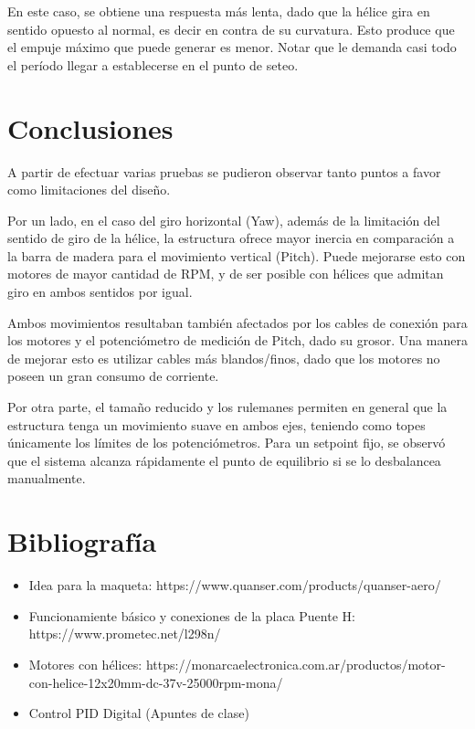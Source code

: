 \documentclass{article}
\begin{document}
En este caso, se obtiene una respuesta más lenta, dado que la hélice gira en sentido opuesto al normal, es decir en contra de su curvatura. Esto produce que el empuje máximo que puede generar es menor. Notar que le demanda casi todo el período llegar a establecerse en el punto de seteo.

\newpage

\section{Conclusiones}

A partir de efectuar varias pruebas se pudieron observar tanto puntos a favor como limitaciones del diseño.\par
Por un lado, en el caso del giro horizontal (Yaw), además de la limitación del sentido de giro de la hélice, la estructura ofrece mayor inercia en comparación a la barra de madera para el movimiento vertical (Pitch). Puede mejorarse esto con motores de mayor cantidad de RPM, y de ser posible con hélices que admitan giro en ambos sentidos por igual.\par
Ambos movimientos resultaban también afectados por los cables de conexión para los motores y el potenciómetro de medición de Pitch, dado su grosor. Una manera de mejorar esto es utilizar cables más blandos/finos, dado que los motores no poseen un gran consumo de corriente.\par
Por otra parte, el tamaño reducido y los rulemanes permiten en general que la estructura tenga un movimiento suave en ambos ejes, teniendo como topes únicamente los límites de los potenciómetros. Para un setpoint fijo, se observó que el sistema alcanza rápidamente el punto de equilibrio si se lo desbalancea manualmente.

\newpage

\section{Bibliografía}
\begin{itemize}
\item Idea para la maqueta: https://www.quanser.com/products/quanser-aero/
\item Funcionamiente básico y conexiones de la placa Puente H: https://www.prometec.net/l298n/ 
\item Motores con hélices: https://monarcaelectronica.com.ar/productos/motor-con-helice-12x20mm-dc-37v-25000rpm-mona/
\item Control PID Digital (Apuntes de clase)
\end{itemize}
\end{document}
